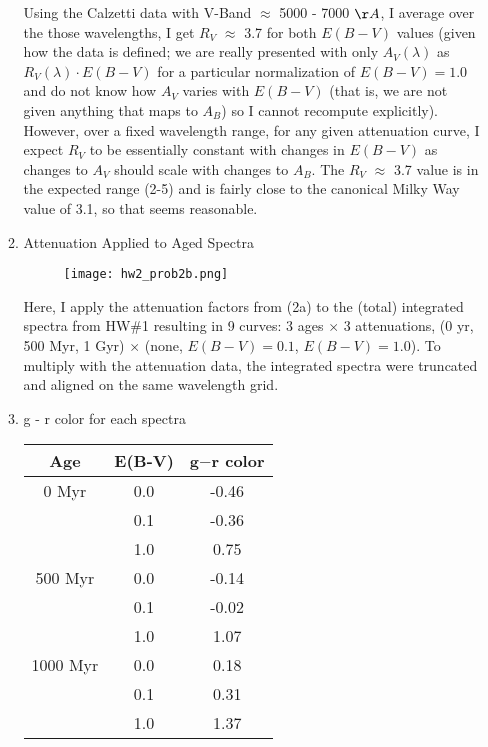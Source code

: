 \documentclass[11pt]{article}
\begin{document}
\begin{enumerate}
\begin{enumerate}

		Using the Calzetti data with V-Band $\approx$ 5000 - 7000 $\AA$, I average over the those wavelengths, I get $R_V$ $\approx$ 3.7 for both $E(B-V)$ values (given how the data is defined; we are really presented with only $A_{V}(\lambda)$ as $R_{V}(\lambda) \cdot E(B-V)$ for a particular normalization of $E(B-V)=1.0$ and do not know how $A_V$ varies with $E(B-V)$ (that is, we are not given anything that maps to $A_B$) so I cannot recompute explicitly). However, over a fixed wavelength range, for any given attenuation curve, I expect $R_V$ to be essentially constant with changes in $E(B-V)$ as changes to $A_V$ should scale with changes to $A_B$. The $R_V$ $\approx$ 3.7 value is in the expected range (2-5) and is fairly close to the canonical Milky Way value of 3.1, so that seems reasonable.

    \item Attenuation Applied to Aged Spectra\\
    
       		\begin{figure}[H]
    		    \texttt{[image: hw2\_prob2b.png]}
    		    \caption{}
    		    \label{}
       		\end{figure}
	       		
	       		
	 Here, I apply the attenuation factors from (2a) to the (total) integrated spectra from HW\#1 resulting in 9 curves: 3 ages $\times$ 3 attenuations, (0 yr, 500 Myr, 1 Gyr) $\times$ (none, $E(B-V)=0.1$, $E(B-V)=1.0$). To multiply with the attenuation data, the integrated spectra were truncated and aligned on the same wavelength grid.
    
    
    \item g - r color for each spectra\\
    

    	\begin{tabular}{c|c|c}
    	Age & E(B-V) & g$-$r color \\
    	  \hline
    	  0 Myr &  0.0 & -0.46 \\
    		   &  0.1 & -0.36 \\
    		   &  1.0 & 0.75 \\
    	  \hline
    	  500 Myr & 0.0 & -0.14 \\
    			  & 0.1 & -0.02 \\
    			  & 1.0 & 1.07 \\
    	  \hline
    	  1000 Myr &  0.0 & 0.18 \\
    	  		&  0.1 & 0.31 \\
    	  	    &  1.0 & 1.37 \\
    	  \hline
    	\end{tabular}
    

\end{enumerate}
\end{enumerate}
\end{document}
